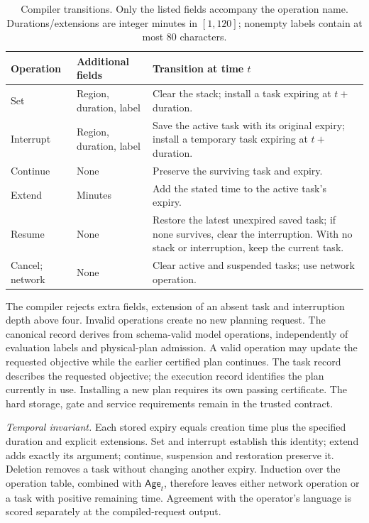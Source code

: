 \begin{table}[t]
\centering\small
\caption{Compiler transitions. Only the listed fields accompany the operation
name. Durations/extensions are integer minutes in $[1,120]$; nonempty labels
contain at most 80 characters.}
\label{tab:task-state-operations}
\begin{tabular}{@{}p{}p{}p{}@{}}
\toprule
Operation & Additional fields & Transition at time $t$\\
\midrule
Set & Region, duration, label & Clear the stack; install a task expiring at
$t+$ duration.\\
Interrupt & Region, duration, label & Save the active task with its original
expiry; install a temporary task expiring at $t+$ duration.\\
Continue & None & Preserve the surviving task and expiry.\\
Extend & Minutes & Add the stated time to the active task's expiry.\\
Resume & None & Restore the latest unexpired saved task; if none survives,
clear the interruption. With no stack or interruption, keep the current task.\\
Cancel; network & None & Clear active and suspended tasks; use network operation.\\
\bottomrule
\end{tabular}
\end{table}

The compiler rejects extra fields, extension of an absent task and
interruption depth above four. Invalid operations create no new planning
request. The canonical record derives from schema-valid model operations,
independently of evaluation labels and physical-plan admission. A valid operation may update the requested objective while the earlier
certified plan continues. The task record describes the requested objective;
the execution record identifies the plan currently in use. Installing a new
plan requires its own passing certificate.
The hard storage, gate and service requirements remain in the trusted contract.

\emph{Temporal invariant.} Each stored expiry equals creation time plus the
specified duration and explicit extensions. Set and interrupt establish this
identity; extend adds exactly its argument; continue, suspension and restoration
preserve it. Deletion removes a task without changing another expiry.
Induction over the operation table, combined with $\mathsf{Age}_t$, therefore leaves either
network operation or a task with positive remaining time. Agreement with the
operator's language is scored separately at the compiled-request output.

